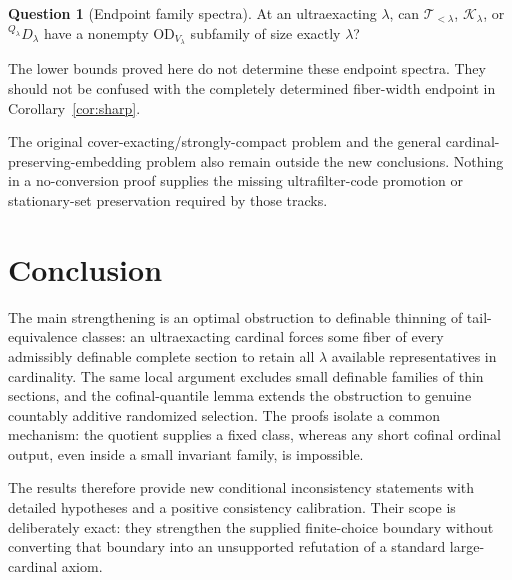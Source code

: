 \documentclass[11pt,letterpaper]{article}
\theoremstyle{definition}
\newtheorem{question}[definition]{Question}
\numberwithin{equation}{section}
\newcommand{\OD}{\mathrm{OD}}
\newcommand{\Thin}{\mathcal T_{<\lambda}}
\newcommand{\Ker}{\mathcal K_\lambda}
\begin{document}
\begin{question}[Endpoint family spectra]
At an ultraexacting $\lambda$, can $\Thin$, $\Ker$, or ${}^{Q_\lambda}D_\lambda$ have a nonempty $\OD_{V_\lambda}$ subfamily of size exactly $\lambda$?
\end{question}
The lower bounds proved here do not determine these endpoint spectra. They should not be confused with the completely determined fiber-width endpoint in Corollary~\ref{cor:sharp}.

The original cover-exacting/strongly-compact problem and the general cardinal-preserving-embedding problem also remain outside the new conclusions. Nothing in a no-conversion proof supplies the missing ultrafilter-code promotion or stationary-set preservation required by those tracks.

\section{Conclusion}

The main strengthening is an optimal obstruction to definable thinning of tail-equivalence classes: an ultraexacting cardinal forces some fiber of every admissibly definable complete section to retain all $\lambda$ available representatives in cardinality. The same local argument excludes small definable families of thin sections, and the cofinal-quantile lemma extends the obstruction to genuine countably additive randomized selection. The proofs isolate a common mechanism: the quotient supplies a fixed class, whereas any short cofinal ordinal output, even inside a small invariant family, is impossible.

The results therefore provide new conditional inconsistency statements with detailed hypotheses and a positive consistency calibration. Their scope is deliberately exact: they strengthen the supplied finite-choice boundary without converting that boundary into an unsupported refutation of a standard large-cardinal axiom.
\end{document}
